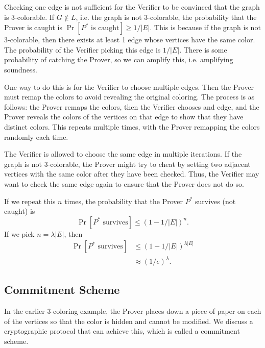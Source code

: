 Checking one edge is not sufficient for the Verifier to be convinced that the graph is 3-colorable. If $G \notin L$, i.e. the graph is not 3-colorable, the probability that the Prover is caught is $\Pr [P^* \text{ is caught}] \geq 1 / |E| $. This is because if the graph is not 3-colorable, then there exists at least 1 edge whose vertices have the same color. The probability of the Verifier picking this edge is $1 / |E|$. There is some probability of catching the Prover, so we can amplify this, i.e. amplifying soundness.

One way to do this is for the Verifier to choose multiple edges. Then the Prover must remap the colors to avoid revealing the original coloring. The process is as follows: the Prover remaps the colors, then the Verifier chooses and edge, and the Prover reveals the colors of the vertices on that edge to show that they have distinct colors. This repeats multiple times, with the Prover remapping the colors randomly each time.

The Verifier is allowed to choose the same edge in multiple iterations. If the graph is not 3-colorable, the Prover might try to cheat by setting two adjacent vertices with the same color after they have been checked. Thus, the Verifier may want to check the same edge again to ensure that the Prover does not do so.

If we repeat this $n$ times, the probability that the Prover $P^*$ survives (not caught) is $$\Pr [P^* \text{ survives}] \leq (1 - 1 / |E|)^n.$$
If we pick $n  = \lambda|E|$, then 
\begin{align*}
    \Pr [P^* \text{ survives}] &\leq (1 - 1 / |E|)^{\lambda |E|} \\
    &\approx (1 / e)^\lambda.
\end{align*}

\subsection{Commitment Scheme}

In the earlier 3-coloring example, the Prover places down a piece of paper on each of the vertices so that the color is hidden and cannot be modified. We discuss a cryptographic protocol that can achieve this, which is called a commitment scheme.


